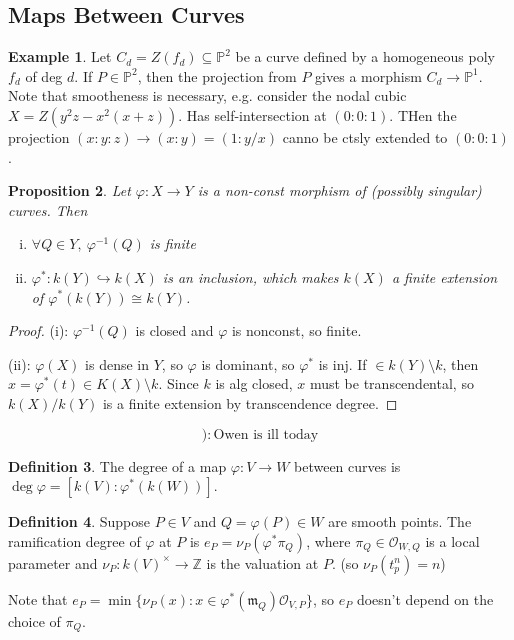 \documentclass{article}
\theoremstyle{definition}
\newtheorem{defn}{Definition}[section]
\newtheorem{example}[defn]{Example}
\theoremstyle{remark}
\theoremstyle{plain}
\newtheorem{prop}[defn]{Proposition}
\newcommand{\ZZ}{\mathbb{Z}}
\newcommand{\PP}{\mathbb{P}}
\begin{document}
\subsection{Maps Between Curves}
\begin{example}
    Let $C_d=Z(f_d)\subseteq\PP^2$ be a curve defined by a homogeneous poly $f_d$ of deg $d$. If $P\in\PP^2$, then the projection from $P$ gives a morphism $C_d\to \PP^1$. Note that smootheness is necessary, e.g. consider the nodal cubic $X=Z(y^2z-x^2(x+z))$. Has self-intersection at $(0:0:1)$. THen the projection $(x:y:z)\to (x:y)=(1:y/x)$ canno be ctsly extended to $(0:0:1)$.
\end{example}
\begin{prop}
    Let $\varphi:X\to Y$ is a non-const morphism of (possibly singular) curves. Then \begin{enumerate}[(i)]
        \item $\forall Q\in Y,\ \varphi^{-1}(Q)$ is finite
        \item $\varphi^\ast:k(Y)\hookrightarrow k(X)$ is an inclusion, which makes $k(X)$ a finite extension of $\varphi^\ast(k(Y))\cong k(Y)$.
    \end{enumerate}
\end{prop}
\begin{proof}
    (i): $\varphi^{-1}(Q)$ is closed and $\varphi$ is nonconst, so finite.

    (ii): $\varphi(X)$ is dense in $Y$, so $\varphi$ is dominant, so $\varphi^\ast$ is inj. If $\in k(Y)\setminus k$, then $x=\varphi^\ast(t)\in K(X)\setminus k$. Since $k$ is alg closed, $x$ must be transcendental, so $k(X)/k(Y)$ is a finite extension by transcendence degree.
\end{proof}
\[):\text{Owen is ill today}\]
\begin{defn}
    The degree of a map $\varphi:V\to W$ between curves is $\deg\varphi=[k(V):\varphi^\ast(k(W))]$.
\end{defn}
\begin{defn}
    Suppose $P\in V$ and $Q=\varphi(P)\in W$ are smooth points. The ramification degree of $\varphi$ at $P$ is $e_P=\nu_P(\varphi^\ast\pi_Q)$, where $\pi_Q\in\mathcal O_{W,Q}$ is a local parameter and $\nu_P:k(V)^\times\to \ZZ$ is the valuation at $P$. (so $\nu_P(t_p^n)=n$)
\end{defn}
Note that $e_P=\min\{\nu_P(x):x\in\varphi^\ast(\mathfrak m_Q)\mathcal O_{V,P}\}$, so $e_P$ doesn't depend on the choice of $\pi_Q$.
\end{document}
